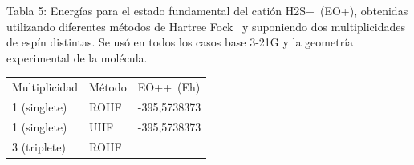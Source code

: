 \documentclass[]{article}
\begin{document}
{}

{Tabla 5}{: Energías para el estado fundamental del catión
H}{2}{S}{+}{~}{(E}{O}{+}{), obtenidas utilizando diferentes métodos de
Hartree Fock ~y suponiendo dos multiplicidades de espín distintas. Se
usó en todos los casos base 3-21G y la geometría experimental de la
molécula.}

{}

\protect\hypertarget{t.173ef4e9e36680a46bb8d829c30c2e3f8bde39e9}{}{}\protect\hypertarget{t.5}{}{}

\begin{longtable}[]{@{}lll@{}}
\toprule
\begin{minipage}[t]{0.30\columnwidth}\raggedright\strut
{Multiplicidad}\strut
\end{minipage} & \begin{minipage}[t]{0.30\columnwidth}\raggedright\strut
{Método}\strut
\end{minipage} & \begin{minipage}[t]{0.30\columnwidth}\raggedright\strut
{E}{O}{++}{~(E}{h}{)}\strut
\end{minipage}\tabularnewline
\begin{minipage}[t]{0.30\columnwidth}\raggedright\strut
{1 (singlete)}\strut
\end{minipage} & \begin{minipage}[t]{0.30\columnwidth}\raggedright\strut
{ROHF}\strut
\end{minipage} & \begin{minipage}[t]{0.30\columnwidth}\raggedright\strut
{-395,5738373}\strut
\end{minipage}\tabularnewline
\begin{minipage}[t]{0.30\columnwidth}\raggedright\strut
{1 (singlete)}\strut
\end{minipage} & \begin{minipage}[t]{0.30\columnwidth}\raggedright\strut
{UHF}\strut
\end{minipage} & \begin{minipage}[t]{0.30\columnwidth}\raggedright\strut
{-395,5738373}\strut
\end{minipage}\tabularnewline
\begin{minipage}[t]{0.30\columnwidth}\raggedright\strut
{3 (triplete)}\strut
\end{minipage} & \begin{minipage}[t]{0.30\columnwidth}\raggedright\strut
{ROHF}\strut
\end{minipage} & \begin{minipage}[t]{0.30\columnwidth}\raggedright\strut

\end{minipage}
\end{longtable}
\end{document}
